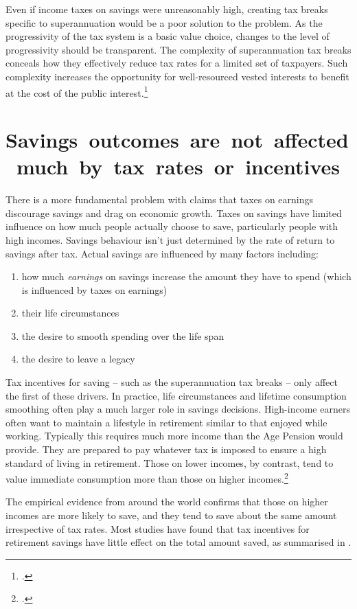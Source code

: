\label{paragraph:SUPER-progressivity-should-be-transparent}
Even if income taxes on savings were unreasonably high, creating tax breaks specific to superannuation would be a poor solution to the problem. As the progressivity of the tax system is a basic value choice, changes to the level of progressivity should be transparent. The complexity of superannuation tax breaks conceals how they effectively reduce tax rates for a limited set of taxpayers. Such complexity increases the opportunity for well-resourced vested interests to benefit at the cost of the public interest.\footcite{Teles2013}  

\section{\mbox{Savings outcomes are not affected much by tax rates or incentives}\label{sec:SUPER-2-6}}
There is a more fundamental problem with claims that taxes on earnings discourage savings and drag on economic growth. Taxes on savings have limited influence on how much people actually choose to save, particularly people with high incomes. Savings behaviour isn’t just determined by the rate of return to savings after tax. Actual savings are influenced by many factors including:
\begin{enumerate}
\item how much \emph{earnings} on savings increase the amount they have to spend (which is influenced by taxes on earnings)
\item their life circumstances
\item the desire to smooth spending over the life span
\item the desire to leave a legacy
\end{enumerate}

Tax incentives for saving -- such as the superannuation tax breaks -- only affect the first of these drivers. In practice, life circumstances and lifetime consumption smoothing often play a much larger role in savings decisions. High-income earners often want to maintain a lifestyle in retirement similar to that enjoyed while working. Typically this requires much more income than the Age Pension would provide. They are prepared to pay whatever tax is imposed to ensure a high standard of living in retirement. Those on lower incomes, by contrast, tend to value immediate consumption more than those on higher incomes.\footcite{DynanSkinnerZeldes2004}  

The empirical evidence from around the world confirms that those on higher incomes are more likely to save, and they tend to save about the same amount irrespective of tax rates. Most studies have found that tax incentives for retirement savings have little effect on the total amount saved, as summarised in .

